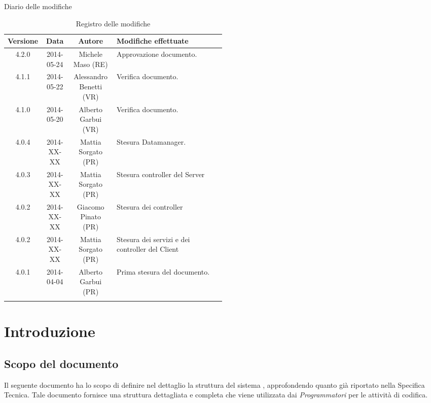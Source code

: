 
\newpage
Diario delle modifiche
\begin{center}
\begin{longtable}{|c|c|c|p{0.5\linewidth}|}
\toprule
\textbf{Versione} & \textbf{Data} & \textbf{Autore} & \textbf{Modifiche effettuate}\\

\midrule
4.2.0 & 2014-05-24 & Michele Maso (RE) & Approvazione documento.\\
\midrule
4.1.1 & 2014-05-22 & Alessandro Benetti (VR) & Verifica documento.\\
\midrule
4.1.0 & 2014-05-20 & Alberto Garbui (VR) & Verifica documento.\\
\midrule
4.0.4 & 2014-XX-XX & Mattia Sorgato (PR) & Stesura Datamanager.\\
\midrule
4.0.3 & 2014-XX-XX & Mattia Sorgato (PR) & Stesura controller del Server\\
\midrule
4.0.2 & 2014-XX-XX & Giacomo Pinato (PR) & Stesura dei controller\\
\midrule
4.0.2 & 2014-XX-XX & Mattia Sorgato (PR) & Stesura dei servizi e dei controller del Client\\
\midrule
4.0.1 & 2014-04-04 & Alberto Garbui (PR) & Prima stesura del documento.\\

\bottomrule
\caption{Registro delle modifiche}
\label{tab:changelog}

\end{longtable}
\end{center}

\newpage
\tableofcontents

\newpage
\listoffigures %

\newpage
\section{Introduzione}
\subsection{Scopo del documento}
Il seguente documento ha lo scopo di definire nel dettaglio la struttura del sistema , approfondendo quanto già riportato 
nella Specifica Tecnica. Tale documento fornisce una struttura dettagliata e completa che viene utilizzata dai \emph{Programmatori} per le 
attività di codifica.

